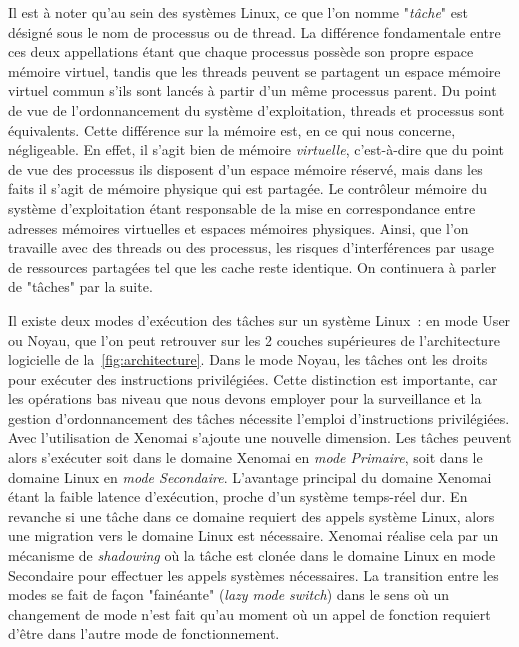 \documentclass[french, a4paper, 11pt, twoside, pdftex]{StyleThese}
\begin{document}
		Il est à noter qu'au sein des systèmes Linux, ce que l'on nomme "\textit{tâche}" est désigné sous le nom de processus ou de thread. La différence fondamentale entre ces deux appellations étant que chaque processus possède son propre espace mémoire virtuel, tandis que les threads peuvent se partagent un espace mémoire virtuel commun s'ils sont lancés à partir d'un même processus parent. Du point de vue de l'ordonnancement du système d'exploitation, threads et processus sont équivalents. Cette différence sur la mémoire est, en ce qui nous concerne, négligeable. En effet, il s'agit bien de mémoire \textit{virtuelle}, c'est-à-dire que du point de vue des processus ils disposent d'un espace mémoire réservé, mais dans les faits il s'agit de mémoire physique qui est partagée. Le contrôleur mémoire du système d'exploitation étant responsable de la mise en correspondance entre adresses mémoires virtuelles et espaces mémoires physiques. Ainsi, que l'on travaille avec des threads ou des processus, les risques d'interférences par usage de ressources partagées tel que les cache reste identique. On continuera à parler de "tâches" par la suite.
		
		Il existe deux modes d'exécution des tâches sur un système Linux~:  en mode User ou Noyau, que l'on peut retrouver sur les 2 couches supérieures de l'architecture logicielle de la~\autoref{fig:architecture}. Dans le mode Noyau, les tâches ont les droits pour exécuter des instructions privilégiées. Cette distinction est importante, car les opérations bas niveau que nous devons employer pour la surveillance et la gestion d'ordonnancement des tâches nécessite l'emploi d'instructions privilégiées. Avec l'utilisation de Xenomai s'ajoute une nouvelle dimension. Les tâches peuvent alors s'exécuter soit dans le domaine Xenomai en \textit{mode Primaire}, soit dans le domaine Linux en \textit{mode Secondaire}. L'avantage principal du domaine Xenomai étant la faible latence d'exécution, proche d'un système temps-réel dur. En revanche si une tâche dans ce domaine requiert des appels système Linux, alors une migration vers le domaine Linux est nécessaire. Xenomai réalise cela par un mécanisme de \textit{shadowing} où la tâche est clonée dans le domaine Linux en mode Secondaire pour effectuer les appels systèmes nécessaires. La transition entre les modes se fait de façon "fainéante" (\textit{lazy mode switch}) dans le sens où un changement de mode n'est fait qu'au moment où un appel de fonction requiert d'être dans l'autre mode de fonctionnement.
		
\end{document}
